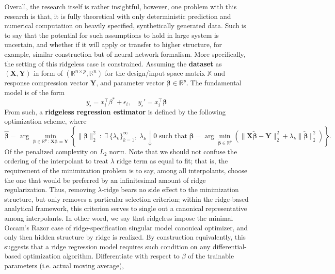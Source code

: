 Overall, the research itself is rather insightful, however, one problem with this research is that, it is fully theoretical with only deterministic prediction and numerical computation on heavily specified, synthetically generated data. Such is to say that the potential for such assumptions to hold in large system is uncertain, and whether if it will apply or transfer to higher structure, for example, similar construction but of neural network formalism. More specifically, the setting of this ridgeless case is constrained. Assuming the \textbf{dataset} as $(\mathbf{X},\mathbf{Y})$ in form of $(\mathbb{R}^{n\times p},\mathbb{R}^{n})$ for the design/input space matrix $\mathbb{X}$ and response compression vector $\mathbf{Y}$, and parameter vector $\bm{\beta} \in \mathbb{R}^{p}$. The fundamental model is of the form
\begin{equation}
    y_{i} = x_{i}^{\top}\beta^{*} + \epsilon_{i}, \quad y_{i}' = x_{i}^{\top}\bm{\beta} 
\end{equation}
From such, a \textbf{ridgeless regression estimator} is defined by the following optimization scheme, where
\begin{equation}
\hat{\bm{\beta}}
=
\arg\min_{\bm{\beta} \in \mathbb{R}^{p} \,:\, \mathbf{X}\bm{\beta} = \mathbf{Y}}
\left\{
\|\bm{\beta}\|_{2}^{2}
\;:\;
\exists\,\{\lambda_{k}\}_{k=1}^{\infty},\;
\lambda_{k} \downarrow 0
\text{ such that }
\bm{\beta}
=
\arg\min_{\tilde{\bm{\beta}} \in \mathbb{R}^{p}}
\left(
\|\mathbf{X}\tilde{\bm{\beta}} - \mathbf{Y}\|_{2}^{2}
+
\lambda_{k}\|\tilde{\bm{\beta}}\|_{2}^{2}
\right)
\right\}.
\end{equation}
Of the penalized complexity on $L_{2}$ norm. Note that we should not confuse the ordering of the interpolant to treat $\lambda$ ridge term as equal to fit; that is, the requirement of the minimization problem is to say, among all interpolants, choose the one that would be preferred by an infinitesimal amount of ridge regularization. Thus, removing $\lambda$-ridge bears no side effect to the minimization structure, but only removes a particular selection criterion; within the ridge-based analytical framework, this criterion serves to single out a canonical representative among interpolants. In other word, we say that ridgeless impose the minimal Occam's Razor case of ridge-specification singular model canonical optimizer, and only then hidden structure by ridge is realized. By construction equivalently, this suggests that a ridge regression model requires such condition on any differential-based optimization algorithm. Differentiate with respect to $\beta$ of the trainable parameters (i.e. actual moving average),
